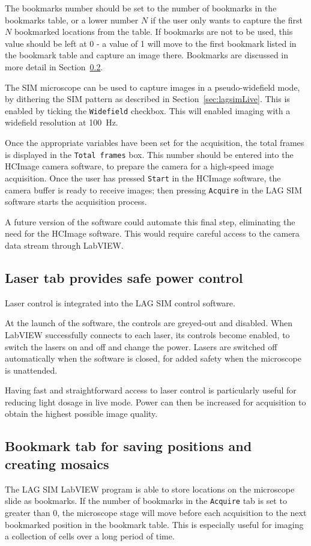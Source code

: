 The bookmarks number should be set to the number of bookmarks in the bookmarks table, or a lower number $N$ if the user only wants to capture the first $N$ bookmarked locations from the table. 
If bookmarks are not to be used, this value should be left at 0 - a value of 1 will move to the first bookmark listed in the bookmark table and capture an image there. 
Bookmarks are discussed in more detail in Section~\ref{sec:lagsimBookmarks}. 

The SIM microscope can be used to capture images in a pseudo-widefield mode, by dithering the SIM pattern as described in Section~\ref{sec:lagsimLive}. 
This is enabled by ticking the \texttt{Widefield} checkbox. 
This will enabled imaging with a widefield resolution at \SI{100}{\hertz}. 

Once the appropriate variables have been set for the acquisition, the total frames is displayed in the \texttt{Total frames} box. 
This number should be entered into the HCImage camera software, to prepare the camera for a high-speed image acquisition. 
Once the user has pressed \texttt{Start} in the HCImage software, the camera buffer is ready to receive images; then pressing \texttt{Acquire} in the LAG SIM software starts the acquisition process. 

A future version of the software could automate this final step, eliminating the need for the HCImage software.
This would require careful access to the camera data stream through LabVIEW. 


\subsection{Laser tab provides safe power control}
Laser control is integrated into the LAG SIM control software. 

At the launch of the software, the controls are greyed-out and disabled. 
When LabVIEW successfully connects to each laser, its controls become enabled, to switch the lasers on and off and change the power. 
Lasers are switched off automatically when the software is closed, for added safety when the microscope is unattended. 

Having fast and straightforward access to laser control is particularly useful for reducing light dosage in live mode.
Power can then be increased for acquisition to obtain the highest possible image quality. 

\subsection{Bookmark tab for saving positions and creating mosaics} \label{sec:lagsimBookmarks}
The LAG SIM LabVIEW program is able to store locations on the microscope slide as bookmarks.
If the number of bookmarks in the \texttt{Acquire} tab is set to greater than 0, the microscope stage will move before each acquisition to the next bookmarked position in the bookmark table. 
This is especially useful for imaging a collection of cells over a long period of time. 

